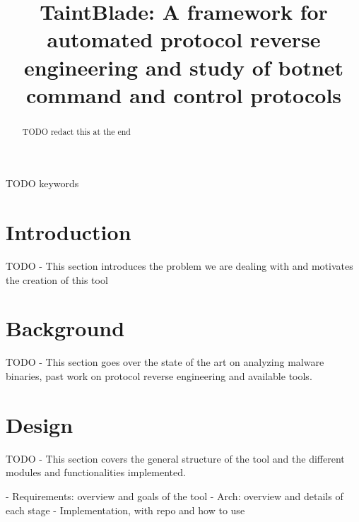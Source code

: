 \documentclass[conference]{IEEEtran}
\begin{document}
\title{TaintBlade: A framework for automated protocol reverse engineering and study of botnet command and control protocols
}

\author{
    \and
}

\maketitle

\begin{abstract}
    TODO redact this at the end
\end{abstract}

\begin{IEEEkeywords}
    TODO keywords
\end{IEEEkeywords}

\section{Introduction}
TODO - This section introduces the problem we are dealing with and motivates
the creation of this tool

\section{Background}

TODO - This section goes over the state of the art on analyzing malware
binaries, past work on protocol reverse engineering and available tools.

\section{Design}
TODO - This section covers the general structure of the tool and the different
modules and functionalities implemented.

- Requirements: overview and goals of the tool
- Arch: overview and details of each stage
- Implementation, with repo and how to use
\end{document}
